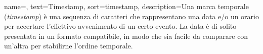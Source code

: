 {
    name=,
    text=Timestamp,
    sort=timestamp,
    description={Una marca temporale (\textit{timestamp}) è una sequenza di caratteri che rappresentano una data e/o un orario per accertare l'effettivo avvenimento di un certo evento. La data è di solito presentata in un formato compatibile, in modo che sia facile da comparare con un'altra per stabilirne l'ordine temporale.}
}

